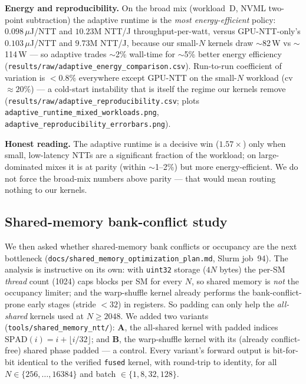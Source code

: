 \documentclass[11pt,a4paper]{article}
\begin{document}
\textbf{Energy and reproducibility.} On the broad mix (workload~D, NVML two-point subtraction) the
adaptive runtime is the \emph{most energy-efficient} policy: $0.098\,\mu$J/NTT and $10.23$M NTT/J
throughput-per-watt, versus GPU-NTT-only's $0.103\,\mu$J/NTT and $9.73$M NTT/J, because our small-$N$
kernels draw $\sim$82\,W vs $\sim$114\,W --- so adaptive trades $\sim$2\% wall-time for $\sim$5\%
better energy efficiency (\texttt{results/raw/adaptive\_energy\_comparison.csv}). Run-to-run
coefficient of variation is $<0.8\%$ everywhere except GPU-NTT on the small-$N$ workload (cv
$\approx20\%$) --- a cold-start instability that is itself the regime our kernels remove
(\texttt{results/raw/adaptive\_reproducibility.csv}; plots
\texttt{adaptive\_runtime\_mixed\_workloads.png}, \texttt{adaptive\_reproducibility\_errorbars.png}).

\textbf{Honest reading.} The adaptive runtime is a decisive win ($1.57\times$) only when small,
low-latency NTTs are a significant fraction of the workload; on large-dominated mixes it is at
parity (within $\sim$1--2\%) but more energy-efficient. We do not force the broad-mix numbers above
parity --- that would mean routing nothing to our kernels.

\subsection{Shared-memory bank-conflict study}
\label{sec:sharedmem}

We then asked whether shared-memory bank conflicts or occupancy are the next bottleneck
(\texttt{docs/shared\_memory\_optimization\_plan.md}, Slurm job~94). The analysis is instructive on
its own: with \texttt{uint32} storage ($4N$ bytes) the per-SM \emph{thread} count (1024) caps blocks
per SM for every $N$, so shared memory is \emph{not} the occupancy limiter; and the
warp-shuffle kernel already performs the bank-conflict-prone early stages (stride ${<}32$) in
registers. So padding can only help the \emph{all-shared} kernels used at $N\ge2048$. We added two
variants (\texttt{tools/shared\_memory\_ntt/}): \textbf{A}, the all-shared kernel with padded indices
$\text{SPAD}(i)=i+\lfloor i/32\rfloor$; and \textbf{B}, the warp-shuffle kernel with its (already
conflict-free) shared phase padded --- a control. Every variant's forward output is bit-for-bit
identical to the verified \texttt{fused} kernel, with round-trip to identity, for all
$N\in\{256,\dots,16384\}$ and batch $\in\{1,8,32,128\}$.
\end{document}
